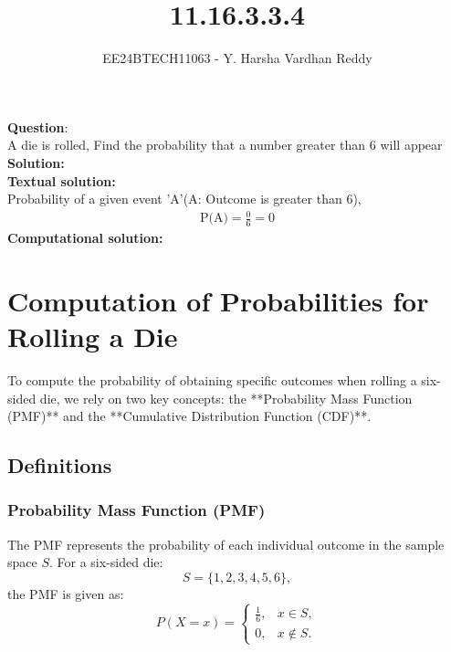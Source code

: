 \documentclass[journal]{IEEEtran}
\begin{document}
	
	
	\vspace{3cm}
	
	\title{11.16.3.3.4}
	\author{EE24BTECH11063 - Y. Harsha Vardhan Reddy }
	{\let\newpage\relax\maketitle}
	
	\renewcommand{\thefigure}{\theenumi}
	\renewcommand{\thetable}{\theenumi}
	\setlength{\intextsep}{10pt} %
	
	
	\renewcommand{\thetable}{\theenumi}
	
	
\textbf{Question}:\\
A die is rolled, Find the probability that a number greater than 6 will appear \\
\textbf{Solution: }\\
\textbf{Textual solution: }\\
Probability of a given event 'A'(A: Outcome is greater than 6),\\
\begin{align}
    \text{P(A)}=\frac{0}{6}=0
\end{align}
\textbf{Computational solution: }\\

\section*{Computation of Probabilities for Rolling a Die}

To compute the probability of obtaining specific outcomes when rolling a six-sided die, we rely on two key concepts: the **Probability Mass Function (PMF)** and the **Cumulative Distribution Function (CDF)**.

\subsection*{Definitions}
\subsubsection*{Probability Mass Function (PMF)}
The PMF represents the probability of each individual outcome in the sample space \( S \). For a six-sided die:
\[
S = \{1, 2, 3, 4, 5, 6\},
\]
the PMF is given as:
\[
P(X = x) = 
\begin{cases} 
\frac{1}{6}, & x \in S, \\ 
0, & x \notin S.
\end{cases}
\]
\end{document}

